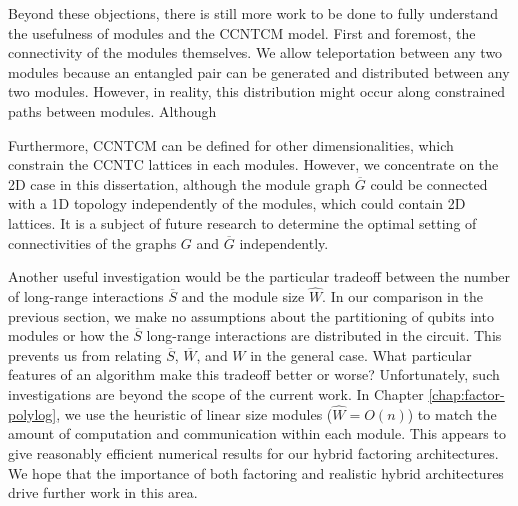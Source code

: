 Beyond these objections, there is still more work to be done to fully
understand the usefulness of modules and the \textsf{CCNTCM} model.
First and foremost, the connectivity
of the modules themselves. We allow teleportation between any two modules
because an entangled pair can be generated and distributed between any
two modules. However, in reality, this distribution might occur along
constrained paths between modules. Although 

Furthermore, \textsf{CCNTCM} can be defined for other dimensionalities,
which constrain the \textsf{CCNTC} lattices in each modules.
However, we concentrate on the \textsf{2D} case in this dissertation,
although the module graph $\overline{G}$ could be connected with
a \textsc{1D} topology independently of the modules, which could contain
\textsc{2D} lattices. It is a subject of future research to determine
the optimal setting of connectivities of the graphs $G$
and $\overline{G}$ independently.

Another useful investigation would be
the particular tradeoff between the number of
long-range interactions $\overline{S}$ and the module size $\hat{W}$.
In our comparison in the previous section, we make no assumptions about the 
partitioning of qubits into
modules or how the $\overline{S}$ long-range interactions are distributed
in the circuit. This prevents us from relating $\overline{S}$,
$\overline{W}$, and $W$ in the general case.
What particular features of an algorithm make this tradeoff better or worse?
Unfortunately, such investigations are beyond the scope of the current
work. In Chapter \ref{chap:factor-polylog}, we use the heuristic of linear 
size modules ($\hat{W} = O(n)$) to match the amount of computation and
communication within each module. This appears to give reasonably efficient
numerical results for our hybrid factoring architectures. We hope that
the importance of
both factoring and realistic hybrid architectures drive further work in this
area.

